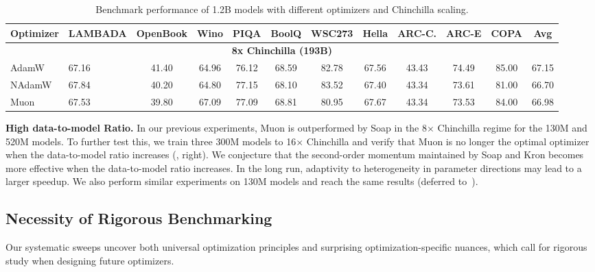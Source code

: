 \setlength{\tabcolsep}{3pt}
\begin{table}[h]
  \centering
  \caption{Benchmark performance of 1.2B models with different optimizers and Chinchilla scaling.}
  \label{tab:bench-1p2b}
  \small
  \begin{tabular}{ll*{10}{c}}
    \toprule
    Optimizer 
      & LAMBADA & OpenBook & Wino & PIQA & BoolQ 
      & WSC273 & Hella & ARC-C. & ARC-E & COPA & Avg \\
    \midrule
      \multicolumn{12}{c}{\textbf{8x Chinchilla (193B)}} \\
     AdamW  & 67.16 & 41.40 & 64.96 & 76.12 & 68.59 
      & 82.78 & 67.56 & 43.43 & 74.49 & 85.00 & 67.15 \\
     NAdamW & 67.84 & 40.20 & 64.80 & 77.15 & 68.10 
      & 83.52 & 67.40 & 43.34 & 73.61 & 81.00 & 66.70 \\
    Muon  & 67.53 & 39.80 & 67.09 & 77.09 & 68.81 
            & 80.95 & 67.67 & 43.34 & 73.53 & 84.00 & {66.98} \\
    \bottomrule
  \end{tabular}
  \label{tab:benchmark}
\end{table}

\textbf{High data-to-model Ratio.} In our previous experiments, Muon is outperformed by Soap in the 8$\times$ Chinchilla regime for the 130M and 520M models. To further test this, we train three 300M models to 16$\times$ Chinchilla and verify that Muon is no longer the optimal optimizer when the data-to-model ratio increases (, right). We conjecture that the second-order momentum maintained by Soap and Kron becomes more effective when the data-to-model ratio increases. In the long run, adaptivity to heterogeneity in parameter directions may lead to a larger speedup. We also perform similar experiments on 130M models and reach the same results (deferred to~).









\subsection{Necessity of Rigorous Benchmarking}

Our systematic sweeps uncover both universal optimization principles and surprising optimization-specific nuances, which call for rigorous study when designing future optimizers. 




